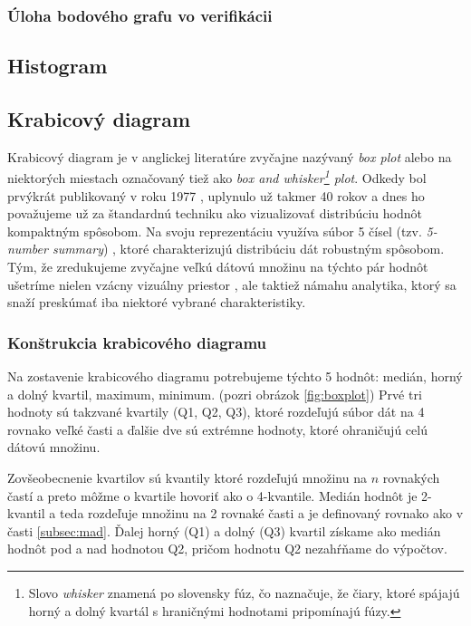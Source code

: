 \subsubsection{Úloha bodového grafu vo verifikácii}

\subsection{Histogram}

\subsection{Krabicový diagram}
\label{subsec:boxplot}
Krabicový diagram je v anglickej literatúre zvyčajne nazývaný \textit{box plot} alebo na niektorých miestach označovaný tiež ako \textit{box and whisker\footnote{Slovo \textit{whisker} znamená po slovensky fúz, čo naznačuje, že čiary, ktoré spájajú horný a dolný kvartál s hraničnými hodnotami pripomínajú fúzy.} plot}. Odkedy bol prvýkrát publikovaný v roku 1977 \cite{Tukey}, uplynulo už takmer 40 rokov a dnes ho považujeme už za štandardnú techniku ako vizualizovať distribúciu hodnôt kompaktným spôsobom. Na svoju reprezentáciu využíva súbor 5 čísel (tzv. \textit{5-number summary}) \cite{Potter}, ktoré charakterizujú distribúciu dát robustným spôsobom. Tým, že zredukujeme zvyčajne veľkú dátovú množinu na týchto pár hodnôt ušetríme nielen vzácny vizuálny priestor \cite{Wickham}, ale taktiež námahu analytika, ktorý sa snaží preskúmať iba niektoré vybrané charakteristiky. 

\subsubsection{Konštrukcia krabicového diagramu}

Na zostavenie krabicového diagramu potrebujeme týchto 5 hodnôt: medián, horný a dolný kvartil, maximum, minimum. (pozri obrázok \ref{fig:boxplot}) Prvé tri hodnoty sú takzvané kvartily (Q1, Q2, Q3), ktoré rozdeľujú súbor dát na 4 rovnako veľké časti a ďalšie dve sú extrémne hodnoty, ktoré ohraničujú celú dátovú množinu. 

Zovšeobecnenie kvartilov sú kvantily ktoré rozdeľujú množinu na $n$ rovnakých častí a preto môžme o kvartile hovoriť ako o 4-kvantile. Medián hodnôt je 2-kvantil a teda rozdeľuje množinu na 2 rovnaké časti a je definovaný rovnako ako v časti \ref{subsec:mad}. Ďalej horný (Q1) a dolný (Q3) kvartil získame ako medián hodnôt pod a nad hodnotou Q2, pričom hodnotu Q2 nezahŕňame do výpočtov. 

